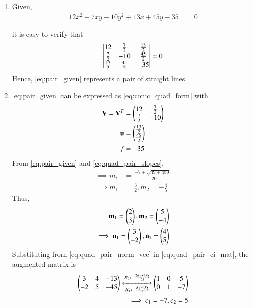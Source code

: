 \renewcommand{\theequation}{\theenumi}
\begin{enumerate}[label=\thesection.\arabic*.,ref=\thesection.\theenumi]

\item 
Given,
\begin{align}
    12x^2+7xy-10y^2+13x+45y-35&=0 
\label{eq:pair_given}
\end{align}

it is easy to verify that
\begin{align}
\begin{vmatrix}
12 &\frac{7}{2}& \frac{13}{2}
\\
\frac{7}{2} & -10 & \frac{45}{2}
\\ 
\frac{13}{2} & \frac{45}{2} & -35
\end{vmatrix} = 0
\end{align}
%
Hence, \eqref{eq:pair_given} represents a pair of straight lines.
%
\item \eqref{eq:pair_given} can be expressed as \eqref{eq:conic_quad_form} with
\begin{align}
    \mathbf{V}=\mathbf{V}^T&=\begin{pmatrix}12 & \frac{7}{2}\\\frac{7}{2} &-10\end{pmatrix}\label{eq:pair_v}\\
    \mathbf{u}&=\begin{pmatrix}\frac{13}{2} \\ \frac{45}{2}\end{pmatrix}\label{eq:pair_u}\\
    f&=-35\label{eq:pair_fv}
\end{align}
From \eqref{eq:pair_given} and \eqref{eq:quad_pair_slopes},
\begin{align}
\label{eq:quad_pair_slopes_ex}
\implies m_i &= \frac{-7 \pm \sqrt{49+480}}{-20}
\\
\implies m_1 &=  \frac{3}{2}, m_2 = -\frac{4}{5}
\end{align}
Thus,
\begin{align}
\mathbf{m}_1 = \begin{pmatrix}2\\3\end{pmatrix},
\mathbf{m}_2 = \begin{pmatrix}5\\-4\end{pmatrix}
\\
\implies
\mathbf{n}_1 = \begin{pmatrix}3\\-2\end{pmatrix},
\mathbf{n}_2 = \begin{pmatrix}4\\5\end{pmatrix}
\label{eq:quad_pair_norm_vec}
\end{align}
Substituting from \eqref{eq:quad_pair_norm_vec}
in \eqref{eq:quad_pair_ci_mat}, the augmented matrix is
\begin{align}
\begin{pmatrix}
3 & 4 & -13
\\
-2 & 5 & -45
\end{pmatrix}
\xleftrightarrow[R_1 \leftarrow \frac{R_1 - 4R_2}{3}]{R_2 \leftarrow \frac{2R_1 + 3R_2}{23}}
\begin{pmatrix}
1 & 0 & 5
\\
0 & 1 & -7
\end{pmatrix}
\\
\implies c_1 = -7, c_2 = 5
\end{align}


\end{enumerate}
